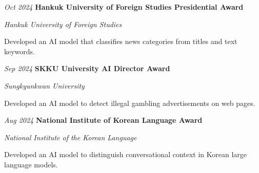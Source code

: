 \vspace{0.08cm}

\begin{samepage}
    \begin{twocolentry}{\textit{Oct 2024}}
        \textbf{Hankuk University of Foreign Studies Presidential Award}
        \par\textit{Hankuk University of Foreign Studies}
    \end{twocolentry}
    \begin{onecolentry}
        \begin{highlights}
            \item Developed an AI model that classifies news categories from titles and text keywords.
        \end{highlights}
    \end{onecolentry}
\end{samepage}

\vspace{0.08cm}

\begin{samepage}
    \begin{twocolentry}{\textit{Sep 2024}}
        \textbf{SKKU University AI Director Award}
        \par\textit{Sungkyunkwan University}
    \end{twocolentry}
    \begin{onecolentry}
        \begin{highlights}
            \item Developed an AI model to detect illegal gambling advertisements on web pages.
        \end{highlights}
    \end{onecolentry}
\end{samepage}

\vspace{0.08cm}

\begin{samepage}
    \begin{twocolentry}{\textit{Aug 2024}}
        \textbf{National Institute of Korean Language Award}\href{https://github.com/rkdrn79/2024_Korean_CCI}{}
        \par\textit{National Institute of the Korean Language}
    \end{twocolentry}
    \begin{onecolentry}
        \begin{highlights}
            \item Developed an AI model to distinguish conversational context in Korean large language models.
        \end{highlights}
    \end{onecolentry}
\end{samepage}

